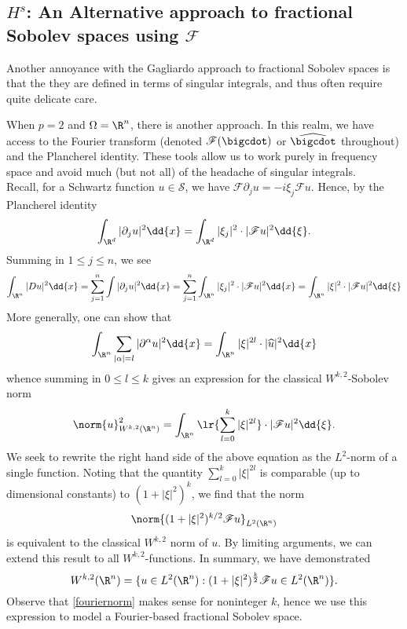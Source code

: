 \documentclass[../main.tex]{subfiles}
\begin{document}
\subsection{$ H^{s} $: An Alternative approach to fractional Sobolev spaces using $ \mathscr{F} $}


Another annoyance with the Gagliardo approach to fractional Sobolev spaces is that the they are defined in terms of singular integrals, and thus often require quite delicate care.

When $ p=2 $ and $ \Omega=\R^{n} $, there is another approach. In this realm, we have access to the Fourier transform (denoted $ \mathscr{F}(\bigcdot) $ or $ \widehat{\bigcdot} $ throughout) and the Plancherel identity. These tools allow us to work purely in frequency space and avoid much (but not all) of the headache of singular integrals.\\
Recall, for a Schwartz function $ u\in \mathscr{S} $, we have $ \mathscr{F}\partial_{j}u = -i\xi_{j}\mathscr{F}u $. Hence, by the Plancherel identity 
\[
    \int_{\R^{d}} | \partial_{j}u |^2 \dd{x} = \int_{\R^{d}} | \xi_{j}|^{2}\cdot |\mathscr{F}u|^{2} \dd{\xi}.
\]
Summing in $ 1\leq j\leq n $, we see
\[
    \int_{\R^{n}}|Du|^{2}\dd{x} = \sum_{j=1}^{n}\int |\partial_{j}u|^{2} \dd{x} = \sum_{j=1}^{n}\int_{\R^{n}}| \xi_{j}|^{2}\cdot |\mathscr{F}u|^{2}\dd{x} = \int_{\R^{n}} | \xi|^{2}\cdot|\mathscr{F}u|^{2} \dd{\xi}
\]
More generally, one can show that
\[
    \int_{\R^{n}}\sum_{| \alpha| = l} | \partial^{\alpha}u|^{2} \dd{x} = \int_{\R^{n}} | \xi|^{2l} \cdot |\widehat{u}|^{2} \dd{x} 
\]
whence summing in $ 0\leq l \leq k $ gives an expression for the classical $ W^{k,2} $-Sobolev norm
\[
    \norm{u}_{W^{k,2}(\R^{n})}^{2} = \int_{\R^{n}} \lr{\sum_{l=0}^{k} | \xi|^{2l} }\cdot |\mathscr{F}u|^{2} \dd{\xi}.
\]
We seek to rewrite the right hand side of the above equation as the $ L^2 $-norm of a single function. 
Noting that the quantity $ \sum_{l=0}^{k}| \xi|^{2l} $ is comparable (up to dimensional constants) to $ (1+| \xi|^{2})^{k} $, we find that the norm
\begin{equation}\label{fouriernorm}
    \norm{(1+| \xi|^{2})^{k/2} \mathscr{F}u}_{L^2(\R^{n})}
\end{equation}
is equivalent to the classical $ W^{k,2} $ norm of $ u $. By limiting arguments, we can extend this result to all $ W^{k,2} $-functions. In summary, we have demonstrated 
\[
    W^{k,2}(\R^{n}) = \{u\in L^{2}(\R^{n}) : (1+| \xi|^{2})^{\frac{k}{2}}\mathscr{F}u \in L^2(\R^{n})\}.
\]
Observe that \ref{fouriernorm} makes sense for noninteger $ k $, hence we use this expression to model a Fourier-based fractional Sobolev space.
\end{document}
